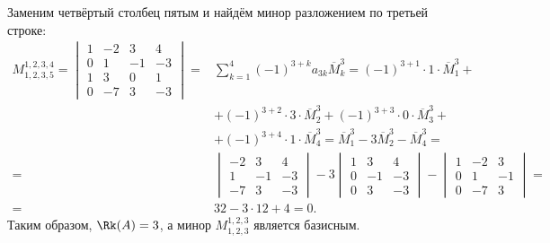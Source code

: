 Заменим четвёртый столбец пятым и найдём минор разложением по третьей строке:
\[
\begin{split}
M_{1,2,3,5}^{1,2,3,4}=
\begin{vmatrix}
	1 & -2 & 3 & 4 \\
	0 & 1 & -1 & -3 \\
	1 & 3 & 0 & 1 \\
	0 & -7 & 3 & -3
\end{vmatrix}
= & \sum_{k=1}^4(-1)^{3+k}a_{3k}\overline{M}_k^3=(-1)^{3+1}\cdot1\cdot\overline{M}_1^3+ \\
& +(-1)^{3+2}\cdot3\cdot\overline{M}_2^3+(-1)^{3+3}\cdot0\cdot\overline{M}_3^3+ \\
& +(-1)^{3+4}\cdot1\cdot\overline{M}_4^3=\overline{M}_1^3-3\overline{M}_2^3-\overline{M}_4^3= \\
= &
\begin{vmatrix}
	-2 & 3 & 4 \\
	1 & -1 & -3 \\
	-7 & 3 & -3
\end{vmatrix}
-3
\begin{vmatrix}
	1 & 3 & 4 \\
	0 & -1 & -3 \\
	0 & 3 & -3
\end{vmatrix}
-
\begin{vmatrix}
	1 & -2 & 3 \\
	0 & 1 & -1 \\
	0 & -7 & 3
\end{vmatrix}
= \\
= & 32-3\cdot12+4=0.
\end{split}
\]
Таким образом, $\Rk(A)=3$, а минор $M_{1,2,3}^{1,2,3}$ является базисным.